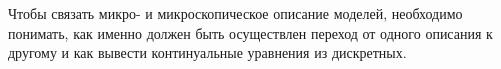 Чтобы связать микро- и микроскопическое описание моделей, необходимо понимать, как именно должен быть осуществлен переход от одного описания к другому и как вывести континуальные уравнения из дискретных.
